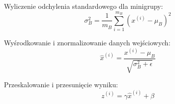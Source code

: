 \documentclass[a4paper,12pt]{article}
\numberwithin{figure}{section}
\begin{document}
    \smallskip

    \noindent
    \begin{minipage}[H]{\textwidth}
        \setlength\parindent{17pt} Wyliczenie odchylenia standardowego dla minigrupy: \\
        \begin{equation}
            \label{eq:minibatch_std_dev}
            \sigma_{B}^{2} = \frac{1}{m_{B}} \displaystyle\sum_{i=1}^{m_{B}} (x^{(i)} - \mu_{B})^{2}
        \end{equation}
    \end{minipage}

    \smallskip

    \noindent
    \begin{minipage}[H]{\textwidth}
        \setlength\parindent{17pt} Wyśrodkowanie i znormalizowanie danych wejściowych: \\
        \begin{equation}
            \label{eq:centering_and_normalizing_input}
            \widehat{x}^{(i)} = \frac{x^{(i)} - \mu_{B}}{\sqrt{\sigma_{B}^{2} + \epsilon}}
        \end{equation}
    \end{minipage}

    \smallskip

    \noindent
    \begin{minipage}[H]{\textwidth}
        \setlength\parindent{17pt} Przeskalowanie i przesunięcie wyniku: \\
        \begin{equation}
            \label{eq:rescaling_and_translating_result}
            z^{(i)} = \gamma\widehat{x}^{(i)} + \beta
        \end{equation}
    \end{minipage}

    \bigskip
\end{document}
